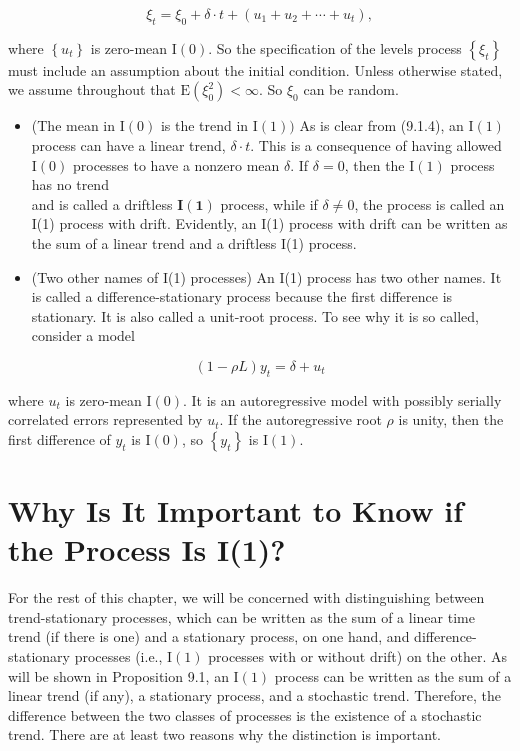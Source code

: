 \documentclass[10pt]{article}
\begin{document}
\begin{equation*}
\xi_{t}=\xi_{0}+\delta \cdot t+\left(u_{1}+u_{2}+\cdots+u_{t}\right), \tag{9.1.4}
\end{equation*}


where $\left\{u_{t}\right\}$ is zero-mean $\mathrm{I}(0)$. So the specification of the levels process $\left\{\xi_{t}\right\}$ must include an assumption about the initial condition. Unless otherwise stated, we assume throughout that $\mathrm{E}\left(\xi_{0}^{2}\right)<\infty$. So $\xi_{0}$ can be random.

\begin{itemize}
  \item (The mean in $\mathrm{I}(0)$ is the trend in $\mathrm{I}(1))$ As is clear from (9.1.4), an $\mathrm{I}(1)$ process can have a linear trend, $\delta \cdot t$. This is a consequence of having allowed $\mathrm{I}(0)$ processes to have a nonzero mean $\delta$. If $\delta=0$, then the $\mathrm{I}(1)$ process has no trend\\
and is called a driftless $\mathbf{I}(\mathbf{1})$ process, while if $\delta \neq 0$, the process is called an I(1) process with drift. Evidently, an I(1) process with drift can be written as the sum of a linear trend and a driftless I(1) process.
  \item (Two other names of I(1) processes) An I(1) process has two other names. It is called a difference-stationary process because the first difference is stationary. It is also called a unit-root process. To see why it is so called, consider a model
\end{itemize}


\begin{equation*}
(1-\rho L) y_{t}=\delta+u_{t} \tag{9.1.5}
\end{equation*}


where $u_{t}$ is zero-mean $\mathrm{I}(0)$. It is an autoregressive model with possibly serially correlated errors represented by $u_{t}$. If the autoregressive root $\rho$ is unity, then the first difference of $y_{t}$ is $\mathrm{I}(0)$, so $\left\{y_{t}\right\}$ is $\mathrm{I}(1)$.

\section*{Why Is It Important to Know if the Process Is I(1)?}
For the rest of this chapter, we will be concerned with distinguishing between trend-stationary processes, which can be written as the sum of a linear time trend (if there is one) and a stationary process, on one hand, and difference-stationary processes (i.e., $\mathrm{I}(1)$ processes with or without drift) on the other. As will be shown in Proposition 9.1, an $\mathrm{I}(1)$ process can be written as the sum of a linear trend (if any), a stationary process, and a stochastic trend. Therefore, the difference between the two classes of processes is the existence of a stochastic trend. There are at least two reasons why the distinction is important.
\end{document}
